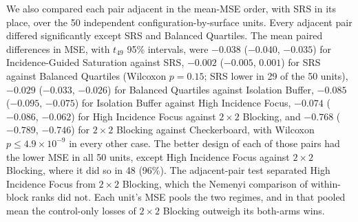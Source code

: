 \documentclass[11pt]{article}
\begin{document}
We also compared each pair adjacent in the mean-MSE order, with SRS in
its place, over the 50 independent configuration-by-surface units. Every
adjacent pair differed significantly except SRS and Balanced Quartiles.
The mean paired differences in MSE, with \(t_{49}\) 95\% intervals, were
\(-0.038\) (\(-0.040\), \(-0.035\)) for Incidence-Guided Saturation
against SRS, \(-0.002\) (\(-0.005\), \(0.001\)) for SRS against
Balanced Quartiles (Wilcoxon \(p = 0.15\); SRS lower in 29 of the 50
units), \(-0.029\) (\(-0.033\), \(-0.026\)) for Balanced Quartiles
against Isolation Buffer, \(-0.085\) (\(-0.095\), \(-0.075\)) for
Isolation Buffer against High Incidence Focus, \(-0.074\) (\(-0.086\),
\(-0.062\)) for High Incidence Focus against \(2\times2\) Blocking, and
\(-0.768\) (\(-0.789\), \(-0.746\)) for \(2\times2\) Blocking against
Checkerboard, with Wilcoxon \(p \le 4.9\times10^{-9}\) in every other case.
The better design of each of those pairs had the lower MSE in all 50 units, except
High Incidence Focus against \(2\times2\) Blocking, where it did so in
48 (96\%). The adjacent-pair test separated High Incidence Focus
from \(2\times2\) Blocking, which the Nemenyi comparison of within-block
ranks did not. Each unit's MSE pools the two regimes, and in that pooled
mean the control-only losses of \(2\times2\) Blocking outweigh its
both-arms wins.
\end{document}
